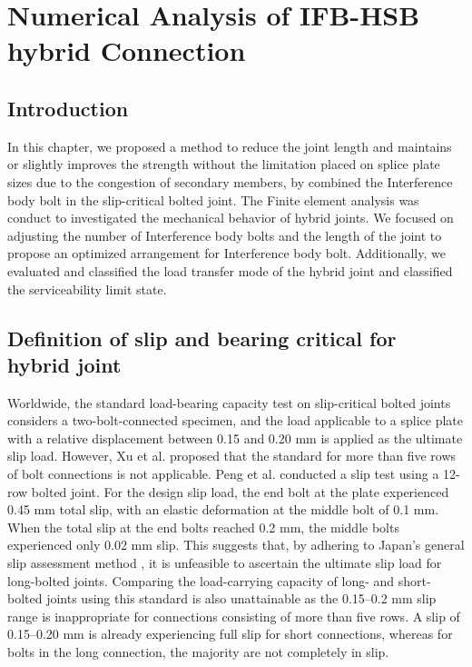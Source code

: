 \chapter{Numerical Analysis of IFB-HSB hybrid Connection}
\label{ch5}

\begin{spacing}{1.25} %
\minitoc %
\end{spacing} %
\onehalfspacing %

\section{Introduction}


In this chapter, we proposed a method to reduce the joint length and maintains or slightly improves the strength without the limitation placed on splice plate sizes due to the congestion of secondary members, by combined the Interference body bolt in the slip-critical bolted joint. The Finite element analysis was conduct to investigated the mechanical behavior of hybrid joints. We focused on adjusting the number of Interference body bolts and the length of the joint to propose an optimized arrangement for Interference body bolt. Additionally, we evaluated and classified the load transfer mode of the hybrid joint and classified the serviceability limit state.


\section{Definition of slip and bearing critical for hybrid joint}

Worldwide, the standard load-bearing capacity test on slip-critical bolted joints considers a two-bolt-connected specimen, and the load applicable to a splice plate with a relative displacement between 0.15 and 0.20 mm is applied as the ultimate slip load. However, Xu et al.\cite{xu2011} proposed that the standard for more than five rows of bolt connections is not applicable.  Peng et al.\cite{Peng2013} conducted a slip test using a 12-row bolted joint. For the design slip load, the end bolt at the plate experienced 0.45 mm total slip, with an elastic deformation at the middle bolt of 0.1 mm. When the total slip at the end bolts reached 0.2 mm, the middle bolts experienced only 0.02 mm slip. This suggests that, by adhering to Japan's general slip assessment method \cite{2012AIJStructures}, it is unfeasible to ascertain the ultimate slip load for long-bolted joints. Comparing the load-carrying capacity of long- and short-bolted joints using this standard is also unattainable as the 0.15--0.2 mm slip range is inappropriate for connections consisting of more than five rows. A slip of 0.15--0.20 mm is already experiencing full slip for short connections, whereas for bolts in the long connection, the majority are not completely in slip. \par

